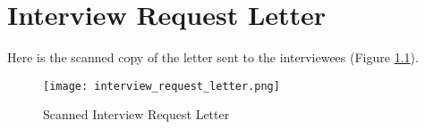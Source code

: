 %
%
%                 
\chapter{Interview Request Letter}
\label{sec:appendixc}
Here is the scanned copy of the letter sent to the interviewees (Figure \ref{fig:interview_letter}).
\begin{figure}[h!]
  \centering
  \texttt{[image: interview\_request\_letter.png]}
  \caption{Scanned Interview Request Letter}
  \label{fig:interview_letter}
\end{figure}

